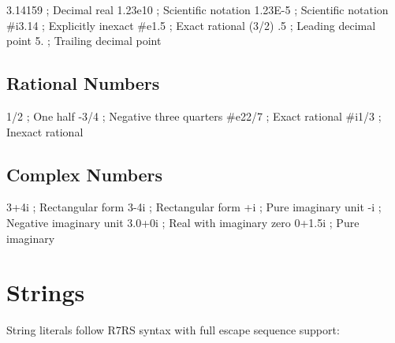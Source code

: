 \begin{lambdustcode}
3.14159     ; Decimal real
1.23e10     ; Scientific notation
1.23E-5     ; Scientific notation  
#i3.14      ; Explicitly inexact
#e1.5       ; Exact rational (3/2)
.5          ; Leading decimal point
5.          ; Trailing decimal point
\end{lambdustcode}

\subsection{Rational Numbers}
\label{subsec:rationals}

\begin{lambdustcode}
1/2         ; One half
-3/4        ; Negative three quarters
#e22/7      ; Exact rational
#i1/3       ; Inexact rational
\end{lambdustcode}

\subsection{Complex Numbers}
\label{subsec:complex}

\begin{lambdustcode}
3+4i        ; Rectangular form
3-4i        ; Rectangular form
+i          ; Pure imaginary unit
-i          ; Negative imaginary unit
3.0+0i      ; Real with imaginary zero
0+1.5i      ; Pure imaginary
\end{lambdustcode}

\section{Strings}
\label{sec:strings}

String literals follow R7RS syntax with full escape sequence support:

\begin{grammar}
\\
\end{grammar}

